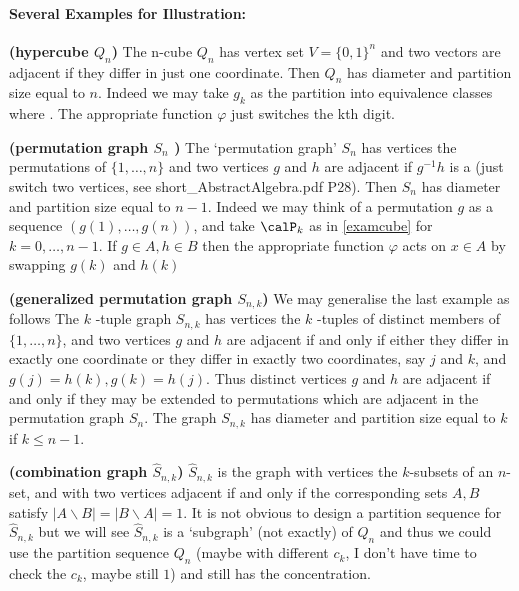 \documentclass{article}
\newcommand{\bfs}[1]{\textbf{({#1})}}
\begin{document}
\paragraph{Several Examples for Illustration:}
\begin{exma}{\bfs{hypercube $Q_n$}}\label{examcube} The n-cube $Q_{n}$ has vertex set $V=\{0,1\}^{n}$ and two vectors are adjacent if they differ in just one coordinate. Then $Q_{n}$ has diameter and partition size equal to $n$. Indeed we may take $g _{ k }$ as the partition into equivalence classes where . The appropriate function $\varphi$ just switches the kth digit.
\end{exma} 
\begin{exma}{\bfs{permutation graph $S_{ n }$ }}\label{examper}
The `permutation graph' $S_{ n }$ has vertices the permutations of $\{1, \ldots, n \}$ and two vertices $g$ and $h$ are adjacent if $g^{-1}h$ is a  (just switch two vertices, see short\_AbstractAlgebra.pdf P28). Then $S_{ n }$ has diameter and partition size equal to $n-1$. Indeed we may think of a permutation $g$ as a sequence $( g (1), \ldots, g ( n ))$, and take $\calP_{ k }$ as in \cref{examcube} for $k =0, \ldots, n -1$. If $g \in A, h \in B$ then the appropriate function $\varphi$ acts on $x \in A$ by swapping $g ( k )$ and $h ( k )$
\end{exma} 
\begin{exma}{\bfs{generalized permutation graph  $S_{n, k}$}}\label{exampergene} We may generalise the last example as follows  The $k$ -tuple graph $S_{n, k}$ has vertices the $k$ -tuples of distinct members of $\{1, \ldots, n \}$, and two vertices $g$ and $h$ are adjacent if and only if either they differ in
exactly one coordinate or they differ in exactly two coordinates, say $j$ and $k$, and
$g ( j )= h ( k ), g ( k )= h ( j ) .$ Thus distinct vertices $g$ and $h$ are adjacent if and only if
they may be extended to permutations which are adjacent in the permutation
graph $S_{n}$. The graph $S_{n, k}$ has diameter and partition size equal to $k$ if $k \leq n-1 .$
\end{exma} 
\begin{exma}{\bfs{combination graph $\hat{S}_{n, k}$}}
$\hat{ S }_{ n , k }$ is the graph with vertices the $k$-subsets of an $n$-set, and with two vertices adjacent if and only if the corresponding sets $A, B$ satisfy $| A \backslash B |=| B \backslash A |=1 .$  It is not obvious to design a  partition sequence for $\hat{S}_{n, k}$ but we will see $\hat{S}_{n, k}$ is a `subgraph' (not exactly) of $Q_{n}$ and thus we could use the partition sequence $Q_{n}$ (maybe with different $c_k$, I don't have time to check the $c_k$, maybe still $1$) and still has the concentration. 
\end{exma}
\end{document}

